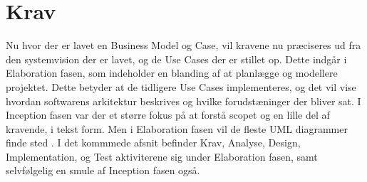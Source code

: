 \chapter{Krav}\label{ch:krav}
Nu hvor der er lavet en Business Model og Case, vil kravene nu præciseres ud fra den systemvision der er lavet, og de Use Cases der er stillet op. Dette indgår i Elaboration fasen, som indeholder en blanding af at planlægge og modellere projektet. Dette betyder at de tidligere Use Cases implementeres, og det vil vise hvordan softwarens arkitektur beskrives og hvilke forudstæninger der bliver sat. I Inception fasen var der et større fokus på at forstå scopet og en lille del af kravende, i tekst form. Men i Elaboration fasen vil de fleste UML diagrammer finde sted \cite{Larman2004}. I det kommmede afsnit befinder Krav, Analyse, Design, Implementation, og Test aktiviterene sig under Elaboration fasen, samt selvfølgelig en smule af Inception fasen også.
 


 